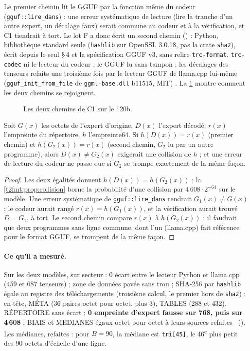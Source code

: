 Le premier chemin lit le GGUF par la fonction même du codeur (\texttt{gguf::lire\_dans}) : une erreur systématique de lecture (lire la tranche d'un autre expert, un décalage faux) serait commune au codeur et à la vérification, et C1 tiendrait à tort. Le lot F a donc écrit un second chemin () : Python, bibliothèque standard seule (\texttt{hashlib} sur OpenSSL 3.0.18, pas la crate \texttt{sha2}), écrit depuis le seul §\,4 et la spécification GGUF v3, sans relire \texttt{trc-format}, \texttt{trc-codec} ni le lecteur du codeur ; le GGUF lu sans tampon ; les décalages des tenseurs refaits une troisième fois par le lecteur GGUF de llama.cpp lui-même (\texttt{gguf\_init\_from\_file} de \texttt{ggml-base.dll} b11515, MIT) \cite{llamacpp_b11515_gguf}. La \cref{t2fmt:fig:cun} montre comment les deux chemins se rejoignent.

\begin{figure}[ht]
\centering
\TdFmtCun
\caption[Les deux chemins de C1]{Les deux chemins de C1 sur le 120b.}
\label{t2fmt:fig:cun}
\end{figure}

\begin{proposition}\label{t2fmt:prop:second-chemin}
Soit $G(x)$ les octets de l'expert d'origine, $D(x)$ l'expert décodé, $r(x)$ l'empreinte du répertoire, $h$ l'empreinte64. Si $h(D(x)) = r(x)$ (premier chemin) et $h(G_2(x)) = r(x)$ (second chemin, $G_2$ lu par un autre programme), alors $D(x) \ne G_2(x)$ exigerait une collision de $h$ ; et une erreur de lecture du codeur ne passe que si $G_2$ se trompe exactement de la même façon.
\end{proposition}
\begin{proof}
Les deux égalités donnent $h(D(x)) = h(G_2(x))$ ; la \cref{t2fmt:prop:collision} borne la probabilité d'une collision par $4\,608 \cdot 2^{-64}$ sur le modèle. Une erreur systématique de \texttt{gguf::lire\_dans} rendrait $G_1(x) \ne G(x)$ ; le codeur aurait rangé $r(x) = h(G_1(x))$, et la vérification aurait trouvé $D = G_1$, à tort. Le second chemin compare $r(x)$ à $h(G_2(x))$ : il faudrait que deux programmes sans ligne commune, dont l'un (llama.cpp) fait référence pour le format GGUF, se trompent de la même façon.
\end{proof}

\paragraph{Ce qu'il a mesuré.} Sur les deux modèles, sur secteur : 0 écart entre le lecteur Python et llama.cpp (459 et 687 tenseurs) ; zone de données pavée sans trou ; SHA-256 par \texttt{hashlib} égale au registre des téléchargements (troisième calcul, le premier hors de \texttt{sha2}) ; en-tête, MÉTA (36 paires octet pour octet, plus 3), TABLES (288 et 432), RÉPERTOIRE sans écart ; \textbf{0 empreinte d'expert fausse sur 768, puis sur 4\,608} ; BIAIS et MEDIANES égaux octet pour octet à leurs sources refaites \mes~(). Les médianes, refaites : pour $B = 90$, la médiane est \texttt{tri[45]}, le 46\textsuperscript{e} plus petit des 90 octets d'échelle d'une ligne.

